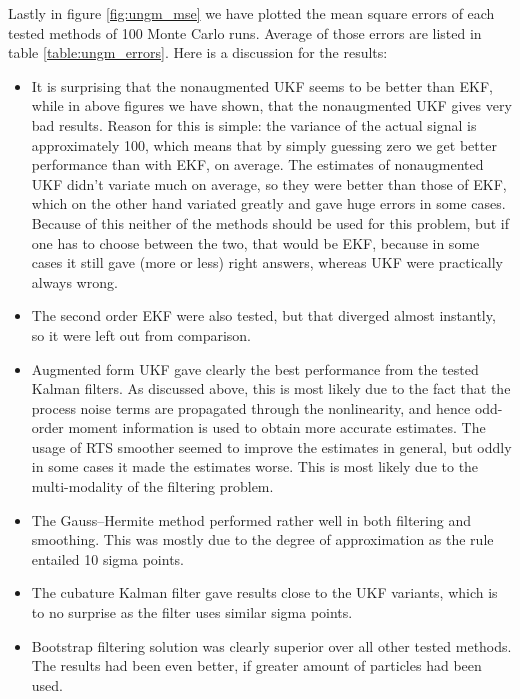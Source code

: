 Lastly in figure \ref{fig:ungm_mse} we have plotted the mean square
errors of each tested methods of 100 Monte Carlo runs. Average of
those errors are listed in table \ref{table:ungm_errors}. Here is a
discussion for the results:
%
\begin{itemize}
\item It is surprising that the nonaugmented UKF seems to be better
than EKF, while in above figures we have shown, that the nonaugmented
UKF gives very bad results. Reason for this is simple: the variance of
the actual signal is approximately 100, which means that by simply
guessing zero we get better performance than with EKF, on average. The
estimates of nonaugmented UKF didn't variate much on average, so they
were better than those of EKF, which on the other hand variated
greatly and gave huge errors in some cases. Because of this neither of
the methods should be used for this problem, but if one has to choose
between the two, that would be EKF, because in some cases it still
gave (more or less) right answers, whereas UKF were practically always
wrong.
\item The second order EKF were also tested, but that diverged almost
instantly, so it were left out from comparison.
\item Augmented form UKF gave clearly the best performance from the
tested Kalman filters. As discussed above, this is most likely due to
the fact that the process noise terms are propagated through the
nonlinearity, and hence odd-order moment information is used to obtain
more accurate estimates. The usage of RTS smoother seemed to improve
the estimates in general, but oddly in some cases it made the
estimates worse. This is most likely due to the multi-modality of the
filtering problem.
\item The Gauss--Hermite method performed rather well in both filtering and
smoothing. This was mostly due to the degree of approximation as the
rule entailed 10 sigma points.
\item The cubature Kalman filter gave results close to the UKF variants,
which is to no surprise as the filter uses similar sigma points.
\item Bootstrap filtering solution was clearly superior over all other
tested methods. The results had been even better, if greater amount of
particles had been used.
\end{itemize}


